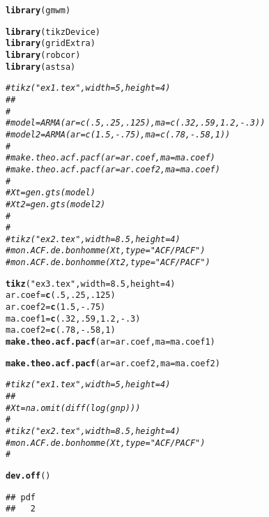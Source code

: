\documentclass{article}\usepackage[]{graphicx}\usepackage[]{color}
\makeatletter
\newcommand{\hlnum}[1]{\textcolor[rgb]{0.686,0.059,0.569}{#1}}%
\newcommand{\hlstr}[1]{\textcolor[rgb]{0.192,0.494,0.8}{#1}}%
\newcommand{\hlcom}[1]{\textcolor[rgb]{0.678,0.584,0.686}{\textit{#1}}}%
\newcommand{\hlopt}[1]{\textcolor[rgb]{0,0,0}{#1}}%
\newcommand{\hlstd}[1]{\textcolor[rgb]{0.345,0.345,0.345}{#1}}%
\newcommand{\hlkwb}[1]{\textcolor[rgb]{0.69,0.353,0.396}{#1}}%
\newcommand{\hlkwc}[1]{\textcolor[rgb]{0.333,0.667,0.333}{#1}}%
\newcommand{\hlkwd}[1]{\textcolor[rgb]{0.737,0.353,0.396}{\textbf{#1}}}%
\newenvironment{kframe}{%
 \def\at@end@of@kframe{}%
 \ifinner\ifhmode%
  \def\at@end@of@kframe{\end{minipage}}%
  \begin{minipage}{\columnwidth}%
 \fi\fi%
 \def\FrameCommand##1{\hskip\@totalleftmargin \hskip-\fboxsep
 \colorbox{shadecolor}{##1}\hskip-\fboxsep
     \hskip-\linewidth \hskip-\@totalleftmargin \hskip\columnwidth}%
 \MakeFramed {\advance\hsize-\width
   \@totalleftmargin\z@ \linewidth\hsize
   \@setminipage}}%
 {\par\unskip\endMakeFramed%
 \at@end@of@kframe}
\newenvironment{knitrout}{}{} %
\makeatother
\begin{document}
\begin{knitrout}
\color{fgcolor}\begin{kframe}
\begin{alltt}
\hlkwd{library}\hlstd{(gmwm)}
\end{alltt}


{\ttfamily\noindent\itshape\color{messagecolor}{\#\# Loading required package: ggplot2}}\begin{alltt}
\hlkwd{library}\hlstd{(tikzDevice)}
\hlkwd{library}\hlstd{(gridExtra)}
\hlkwd{library}\hlstd{(robcor)}
\hlkwd{library}\hlstd{(astsa)}


\hlcom{# tikz("ex1.tex", width = 5, height = 4)}
\hlcom{# #}
\hlcom{# }
\hlcom{# model = ARMA(ar = c(.5, .25, .125) ,ma = c(.32,.59,1.2,-.3))}
\hlcom{# model2 = ARMA(ar = c(1.5, -.75) ,ma = c(.78,-.58,1))}
\hlcom{# }
\hlcom{# make.theo.acf.pacf(ar = ar.coef, ma = ma.coef)}
\hlcom{# make.theo.acf.pacf(ar = ar.coef2, ma = ma.coef)}
\hlcom{# }
\hlcom{# Xt = gen.gts(model)}
\hlcom{# Xt2 = gen.gts(model2)}
\hlcom{# }
\hlcom{# }
\hlcom{# tikz("ex2.tex", width = 8.5, height = 4)}
\hlcom{# mon.ACF.de.bonhomme(Xt, type = "ACF/PACF")}
\hlcom{# mon.ACF.de.bonhomme(Xt2, type = "ACF/PACF")}


\hlkwd{tikz}\hlstd{(}\hlstr{"ex3.tex"}\hlstd{,} \hlkwc{width} \hlstd{=} \hlnum{8.5}\hlstd{,} \hlkwc{height} \hlstd{=} \hlnum{4}\hlstd{)}
\hlstd{ar.coef} \hlkwb{=} \hlkwd{c}\hlstd{(}\hlnum{.5}\hlstd{,} \hlnum{.25}\hlstd{,} \hlnum{.125}\hlstd{)}
\hlstd{ar.coef2} \hlkwb{=} \hlkwd{c}\hlstd{(}\hlnum{1.5}\hlstd{,} \hlopt{-}\hlnum{.75}\hlstd{)}
\hlstd{ma.coef1} \hlkwb{=} \hlkwd{c}\hlstd{(}\hlnum{.32}\hlstd{,}\hlnum{.59}\hlstd{,}\hlnum{1.2}\hlstd{,}\hlopt{-}\hlnum{.3}\hlstd{)}
\hlstd{ma.coef2} \hlkwb{=} \hlkwd{c}\hlstd{(}\hlnum{.78}\hlstd{,}\hlopt{-}\hlnum{.58}\hlstd{,}\hlnum{1}\hlstd{)}
\hlkwd{make.theo.acf.pacf}\hlstd{(}\hlkwc{ar} \hlstd{= ar.coef,} \hlkwc{ma} \hlstd{= ma.coef1)}
\end{alltt}


{\ttfamily\noindent\color{warningcolor}{\#\# Warning: Removed 1 rows containing missing values (geom\_segment).}}\begin{alltt}
\hlkwd{make.theo.acf.pacf}\hlstd{(}\hlkwc{ar} \hlstd{= ar.coef2,} \hlkwc{ma} \hlstd{= ma.coef2)}
\end{alltt}


{\ttfamily\noindent\color{warningcolor}{\#\# Warning: Removed 1 rows containing missing values (geom\_segment).}}\begin{alltt}
\hlcom{# tikz("ex1.tex", width = 5, height = 4)}
\hlcom{# # }
\hlcom{# Xt = na.omit(diff(log(gnp)))}
\hlcom{# }
\hlcom{# tikz("ex2.tex", width = 8.5, height = 4)}
\hlcom{# mon.ACF.de.bonhomme(Xt, type = "ACF/PACF")}
\hlcom{# }


\hlkwd{dev.off}\hlstd{()}
\end{alltt}
\begin{verbatim}
## pdf 
##   2
\end{verbatim}
\end{kframe}
\end{knitrout}

% 
% 
% 
% 
\begin{figure}

\end{figure}
\end{document}
